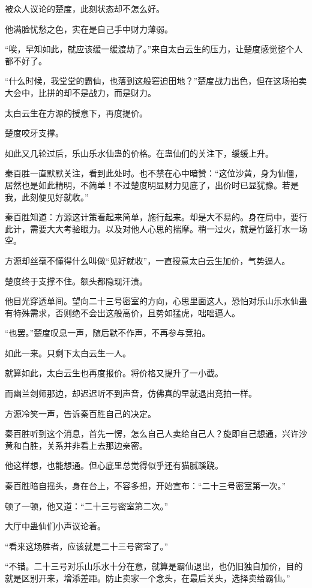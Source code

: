 \begin{this_body}
被众人议论的楚度，此刻状态却不怎么好。

他满脸忧愁之色，实在是自己手中财力薄弱。

“唉，早知如此，就应该缓一缓渡劫了。”来自太白云生的压力，让楚度感觉整个人都不好了。

“什么时候，我堂堂的霸仙，也落到这般窘迫田地？”楚度战力出色，但在这场拍卖大会中，比拼的却不是战力，而是财力。

太白云生在方源的授意下，再度提价。

楚度咬牙支撑。

如此又几轮过后，乐山乐水仙蛊的价格。在蛊仙们的关注下，缓缓上升。

秦百胜一直默默关注，看到此处时。也不禁在心中暗赞：“这位沙黄，身为仙僵，居然也是如此精明，不简单！不过楚度明显财力见底了，出价时已显犹豫。若是我，此刻便见好就收。”

秦百胜知道：方源这计策看起来简单，施行起来。却是大不易的。身在局中，要行此计，需要大大考验眼力。以及对他人心思的揣摩。稍一过火，就是竹篮打水一场空。

方源却丝毫不懂得什么叫做“见好就收”，一直授意太白云生加价，气势逼人。

楚度终于支撑不住。额头都隐现汗渍。

他目光穿透单间。望向二十三号密室的方向，心思里面这人，恐怕对乐山乐水仙蛊有特殊需求，否则绝不会出这般高价，且势如猛虎，咄咄逼人。

“也罢。”楚度叹息一声，随后默不作声，不再参与竞拍。

如此一来。只剩下太白云生一人。

就算如此，太白云生也再度报价。将价格又提升了一小截。

而幽兰剑师那边，却迟迟听不到声音，仿佛真的早就退出竞拍一样。

方源冷笑一声，告诉秦百胜自己的决定。

秦百胜听到这个消息，首先一愣，怎么自己人卖给自己人？旋即自己想通，兴许沙黄和白胜，关系并非看上去那边亲密。

他这样想，也能想通。但心底里总觉得似乎还有猫腻蹊跷。

秦百胜暗自摇头，身在台上，不容多想，开始宣布：“二十三号密室第一次。”

顿了一顿，他又道：“二十三号密室第二次。”

大厅中蛊仙们小声议论着。

“看来这场胜者，应该就是二十三号密室了。”

“不错。二十三号对乐山乐水十分在意，就算是霸仙退出，也仍旧独自加价，目的就是区别开来，增添差距。防止卖家一个念头，在最后关头，选择卖给霸仙。”


\end{this_body}
